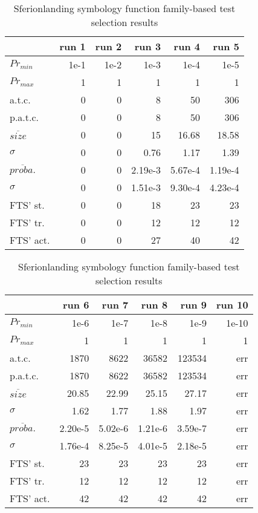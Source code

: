 \begin{table}[t]
\centering
\caption{Sferion\texttrademark landing symbology function family-based test selection results}
\label{tab:familybased:sferion}
\begin{small}
\begin{tabularx}{8.5cm}{lrrrrr} 
\hline
	& \textbf{run 1}	& \textbf{run 2}	& \textbf{run 3}	& \textbf{run 4}	& \textbf{run 5} \\
\hline
$Pr_{min}$ 			& 1e-1	& 1e-2	& 1e-3	& 1e-4	& 1e-5	\\
$Pr_{max}$			& 1	& 1	  & 1	& 1	& 1	\\
a.t.c.				& 0 & 0 & 8 	  & 50 & 306  	\\
p.a.t.c.  			& 0 & 0 & 8 & 50 & 306 	\\
$\overline{size}$	& 0 	& 0 	& 15 	& 16.68 	& 18.58 \\
$\sigma$				& 0	& 0	& 0.76	& 1.17		& 1.39		\\
$\overline{proba.}$	& 0 	& 0 	& 2.19e-3 	& 5.67e-4 	& 1.19e-4 \\
$\sigma$				& 0	& 0	& 1.51e-3	& 9.30e-4	& 4.23e-4	\\
FTS' st.				& 0	& 0	& 18	& 23	& 23	\\
FTS' tr. 			& 0	& 0	& 12	& 12	& 12	\\
FTS' act. 			& 0	& 0	& 27	& 40	& 42	\\
\hline
\end{tabularx}
\end{small}

\vspace{1em}

\begin{small}
\begin{tabularx}{8.5cm}{lrrrrr} 
\hline
	& \textbf{run 6}	& \textbf{run 7}	& \textbf{run 8}	& \textbf{run 9}	& \textbf{run 10} \\
\hline
$Pr_{min}$ 			&  1e-6	& 1e-7	& 1e-8	& 1e-9	& 1e-10	\\
$Pr_{max}$			&  1	& 1	& 1	& 1	& 1	\\
a.t.c.				& 1870 & 8622 & 36582 & 123534 & err 	\\
p.a.t.c. 			& 1870 & 8622 & 36582 & 123534 & err \\
$\overline{size}$	& 20.85 	& 22.99 	& 25.15 	& 27.17	& err 	\\
$\sigma$ 			& 1.62		& 1.77		& 1.88		& 1.97	& err	\\
$\overline{proba.}$	& 2.20e-5 	& 5.02e-6 	& 1.21e-6 	& 3.59e-7 	& err \\
$\sigma$ 			& 1.76e-4	& 8.25e-5	& 4.01e-5	& 2.18e-5	& err 	\\
FTS' st.				& 23	& 23	& 23	& 23	& err	\\
FTS' tr. 			& 12	& 12	& 12	& 12	& err	\\
FTS' act. 			& 42	& 42	& 42	& 42	& err	\\
\hline
\end{tabularx}
\end{small}
\end{table}


